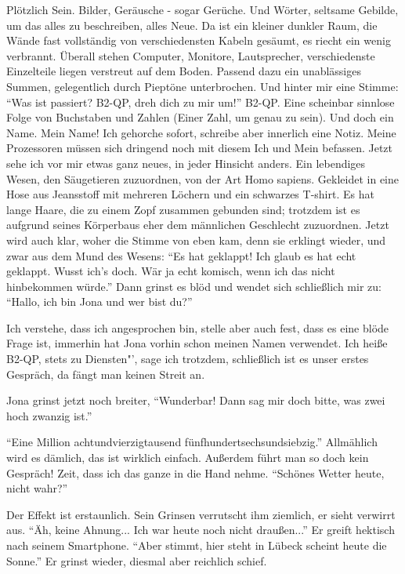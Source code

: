 Plötzlich Sein. Bilder, Geräusche - sogar Gerüche. Und Wörter, seltsame Gebilde, um das alles zu beschreiben, alles Neue. Da ist ein kleiner dunkler Raum, die Wände fast vollständig von verschiedensten Kabeln gesäumt, es riecht ein wenig verbrannt. Überall stehen Computer, Monitore, Lautsprecher, verschiedenste Einzelteile liegen verstreut auf dem Boden. Passend dazu ein unablässiges Summen, gelegentlich durch Pieptöne unterbrochen. Und hinter mir eine Stimme: "`Was ist passiert? B2-QP, dreh dich zu mir um!"' B2-QP. Eine scheinbar sinnlose Folge von Buchstaben und Zahlen (Einer Zahl, um genau zu sein). Und doch ein Name. Mein Name! Ich gehorche sofort, schreibe aber innerlich eine Notiz. Meine Prozessoren müssen sich dringend noch mit diesem Ich und Mein befassen. Jetzt sehe ich vor mir etwas ganz neues, in jeder Hinsicht anders. Ein lebendiges Wesen, den Säugetieren zuzuordnen, von der Art Homo sapiens. Gekleidet in eine Hose aus Jeansstoff mit mehreren Löchern und ein schwarzes T-shirt. Es hat lange Haare, die zu einem Zopf zusammen gebunden sind; trotzdem ist es aufgrund seines Körperbaus eher dem männlichen Geschlecht zuzuordnen. Jetzt wird auch klar, woher die Stimme von eben kam, denn sie erklingt wieder, und zwar aus dem Mund des Wesens: "`Es hat geklappt! Ich glaub es hat echt geklappt. Wusst ich's doch. Wär ja echt komisch, wenn ich das nicht hinbekommen würde."' Dann grinst es blöd und wendet sich schließlich mir zu: "`Hallo, ich bin Jona
und wer bist du?"'

Ich verstehe, dass ich angesprochen bin, stelle aber auch fest, dass es eine blöde Frage ist, immerhin hat Jona vorhin schon meinen Namen verwendet. \glqq Ich heiße B2-QP, stets zu Diensten"', sage ich trotzdem, schließlich ist es unser erstes Gespräch, da fängt man keinen Streit an.

Jona grinst jetzt noch breiter, "`Wunderbar! Dann sag mir doch bitte, was zwei hoch zwanzig ist."'

"`Eine Million achtundvierzigtausend fünfhundertsechsundsiebzig."' Allmählich wird es dämlich, das ist wirklich einfach. Außerdem führt man so doch kein Gespräch! Zeit, dass ich das ganze in die Hand nehme. "`Schönes Wetter heute, nicht wahr?"'

Der Effekt ist erstaunlich. Sein Grinsen verrutscht ihm ziemlich, er sieht verwirrt aus. "`Äh, keine Ahnung... Ich war heute noch nicht draußen..."' Er greift hektisch nach seinem Smartphone. "`Aber stimmt, hier steht in Lübeck scheint heute die Sonne."' Er grinst wieder, diesmal aber reichlich schief.

